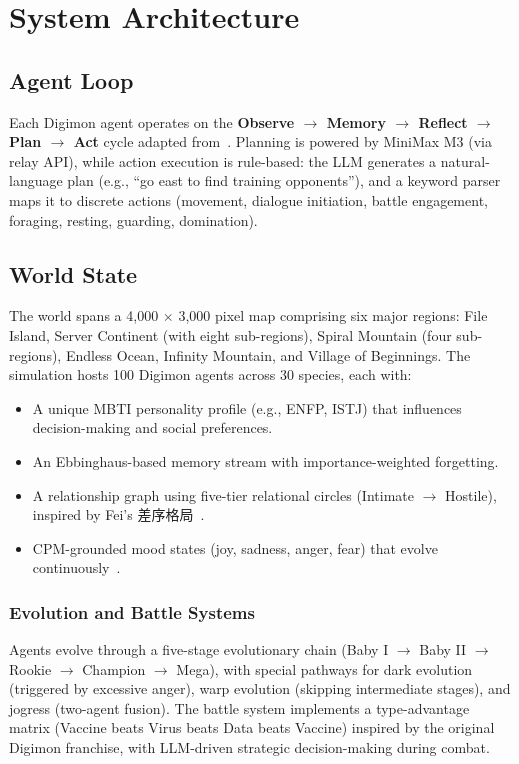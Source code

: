 \documentclass[11pt]{article}
\begin{document}
\section{System Architecture}
\label{sec:architecture}

\subsection{Agent Loop}

Each Digimon agent operates on the \textbf{Observe $\rightarrow$ Memory $\rightarrow$ Reflect $\rightarrow$ Plan $\rightarrow$ Act} cycle adapted from~\cite{park2023generative}.
Planning is powered by MiniMax M3 (via relay API), while action execution is rule-based: the LLM generates a natural-language plan (e.g., ``go east to find training opponents''), and a keyword parser maps it to discrete actions (movement, dialogue initiation, battle engagement, foraging, resting, guarding, domination).

\subsection{World State}

The world spans a 4{,}000 $\times$ 3{,}000 pixel map comprising six major regions:
File Island, Server Continent (with eight sub-regions), Spiral Mountain (four sub-regions), Endless Ocean, Infinity Mountain, and Village of Beginnings.
The simulation hosts 100 Digimon agents across 30 species, each with:
\begin{itemize}[leftmargin=*,nosep]
    \item A unique MBTI personality profile (e.g., ENFP, ISTJ) that influences decision-making and social preferences.
    \item An Ebbinghaus-based memory stream with importance-weighted forgetting.
    \item A relationship graph using five-tier relational circles (Intimate $\rightarrow$ Hostile), inspired by Fei's 差序格局~\cite{fei1947xiangtu}.
    \item CPM-grounded mood states (joy, sadness, anger, fear) that evolve continuously~\cite{liu2026cpm}.
\end{itemize}

\subsubsection{Evolution and Battle Systems}
Agents evolve through a five-stage evolutionary chain (Baby I $\rightarrow$ Baby II $\rightarrow$ Rookie $\rightarrow$ Champion $\rightarrow$ Mega), with special pathways for dark evolution (triggered by excessive anger), warp evolution (skipping intermediate stages), and jogress (two-agent fusion).
The battle system implements a type-advantage matrix (Vaccine beats Virus beats Data beats Vaccine) inspired by the original Digimon franchise, with LLM-driven strategic decision-making during combat.
\end{document}
